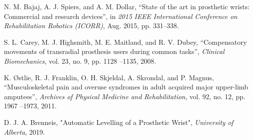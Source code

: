 \documentclass[letterpaper,12pt]{article}
\begin{document}
\pagebreak

\begin{thebibliography}{99}
N. M. Bajaj, A. J. Spiers, and A. M. Dollar, “State of the art in prosthetic wrists: Commercial and research devices”, in \textit{2015 IEEE International Conference on Rehabilitation Robotics
(ICORR)}, Aug. 2015, pp. 331–338.

S. L. Carey, M. J. Highsmith, M. E. Maitland, and R. V. Dubey, “Compensatory movements
of transradial prosthesis users during common tasks”, \textit{Clinical Biomechanics}, vol. 23, no. 9,
pp. 1128 –1135, 2008.



K. Østlie, R. J. Franklin, O. H. Skjeldal, A. Skrondal, and P. Magnus, “Musculoskeletal pain
and overuse syndromes in adult acquired major upper-limb amputees”, \textit{Archives of Physical
Medicine and Rehabilitation}, vol. 92, no. 12, pp. 1967 –1973, 2011.

D. J. A. Brenneis, "Automatic Levelling of a Prosthetic Wrist", \textit{University of Alberta}, 2019.


\end{thebibliography}
\end{document}
